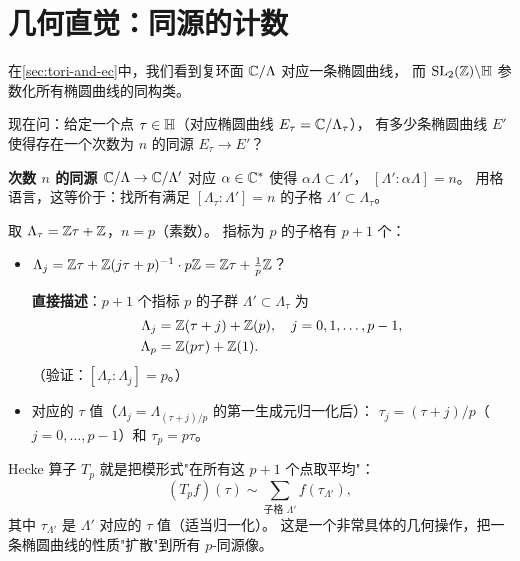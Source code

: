 \section{几何直觉：同源的计数}
\label{sec:hecke-motivation}

在\cref{sec:tori-and-ec}中，我们看到复环面 $\mathbb{C}/\Lambda$ 对应一条椭圆曲线，
而 $\mathrm{SL}_2(\mathbb{Z}) \backslash \mathbb{H}$ 参数化所有椭圆曲线的同构类。

现在问：给定一个点 $\tau \in \mathbb{H}$（对应椭圆曲线 $E_\tau = \mathbb{C}/\Lambda_\tau$），
有多少条椭圆曲线 $E'$ 使得存在一个次数为 $n$ 的同源 $E_\tau \to E'$？

\textbf{次数 $n$ 的同源 $\mathbb{C}/\Lambda \to \mathbb{C}/\Lambda'$}
对应 $\alpha \in \mathbb{C}^*$ 使得 $\alpha\Lambda \subset \Lambda'$，
$[\Lambda' : \alpha\Lambda] = n$。
用格语言，这等价于：找所有满足 $[\Lambda_\tau : \Lambda'] = n$ 的子格 $\Lambda' \subset \Lambda_\tau$。

\begin{example}[$n=p$（素数）时的子格]
\label{ex:sublattices-prime}
取 $\Lambda_\tau = \mathbb{Z}\tau + \mathbb{Z}$，$n = p$（素数）。
指标为 $p$ 的子格有 $p + 1$ 个：
\begin{itemize}
  \item $\Lambda_j = \mathbb{Z}\tau + \mathbb{Z}(j\tau + p)^{-1}\cdot p\mathbb{Z} = \mathbb{Z}\tau + \frac{1}{p}\mathbb{Z}$？

    \textbf{直接描述}：$p+1$ 个指标 $p$ 的子群 $\Lambda' \subset \Lambda_\tau$ 为
    \begin{align*}
      \Lambda_j &= \mathbb{Z}(\tau + j) + \mathbb{Z}(p), \quad j = 0, 1, \ldots, p-1, \\
      \Lambda_p &= \mathbb{Z}(p\tau) + \mathbb{Z}(1).
    \end{align*}
    （验证：$[\Lambda_\tau : \Lambda_j] = p$。）
  \item 对应的 $\tau$ 值（$\Lambda_j = \Lambda_{(τ+j)/p}$ 的第一生成元归一化后）：
    $\tau_j = (\tau + j)/p$（$j = 0, \ldots, p-1$）和 $\tau_p = p\tau$。
\end{itemize}
\end{example}

Hecke 算子 $T_p$ 就是把模形式"在所有这 $p+1$ 个点取平均"：
\[
  (T_p f)(\tau) \sim \sum_{\text{子格 } \Lambda'} f(\tau_{\Lambda'}),
\]
其中 $\tau_{\Lambda'}$ 是 $\Lambda'$ 对应的 $\tau$ 值（适当归一化）。
这是一个非常具体的几何操作，把一条椭圆曲线的性质"扩散"到所有 $p$-同源像。


